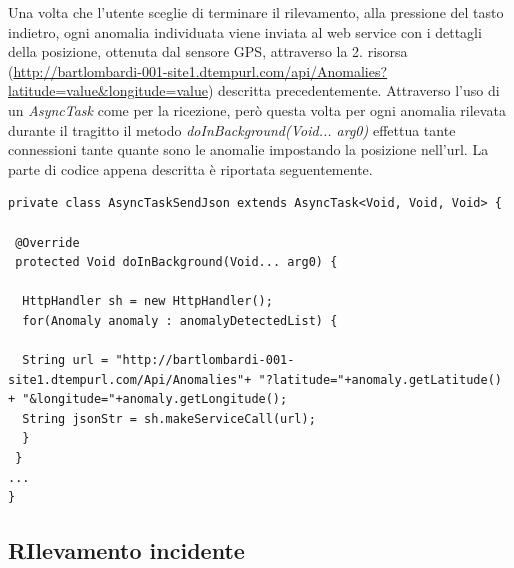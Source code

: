 \documentclass[a4paper, 11pt]{article} %
\begin{document}
Una volta che l'utente sceglie di terminare il rilevamento, alla pressione del tasto indietro, ogni anomalia individuata viene inviata al web service con i dettagli della posizione, ottenuta dal sensore GPS, attraverso la 2. risorsa (\url{http://bartlombardi-001-site1.dtempurl.com/api/Anomalies?latitude=value&longitude=value}) descritta precedentemente.
Attraverso l'uso di un \textit{AsyncTask} come per la ricezione, però questa volta per ogni anomalia rilevata durante il tragitto il metodo \textit{doInBackground(Void... arg0)} effettua tante connessioni tante quante sono le anomalie impostando la posizione nell'url. La parte di codice appena descritta è riportata seguentemente.\\

\begin{lstlisting}
private class AsyncTaskSendJson extends AsyncTask<Void, Void, Void> {

 @Override
 protected Void doInBackground(Void... arg0) {

  HttpHandler sh = new HttpHandler();
  for(Anomaly anomaly : anomalyDetectedList) {

  String url = "http://bartlombardi-001-site1.dtempurl.com/Api/Anomalies"+ "?latitude="+anomaly.getLatitude() + "&longitude="+anomaly.getLongitude();
  String jsonStr = sh.makeServiceCall(url);
  }  
 }
...
}
\end{lstlisting}
\newpage



\subsection*{RIlevamento incidente}

\newpage




\end{document}
